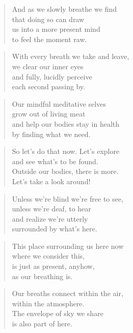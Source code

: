 \documentclass[10pt,a4paper]{article}
\begin{document}
\begin{paracol}{2}
\begin{verse}
And as we slowly breathe we find\\
that doing so can draw\\
us into a more present mind\\
to feel the moment raw.
\end{verse}

\begin{verse}
With every breath we take and leave,\\
we clear our inner eyes\\
and fully, lucidly perceive\\
each second passing by.
\end{verse}

\begin{verse}
Our mindful meditative selves\\
grow out of living meat\\
and help our bodies stay in health\\
by finding what we need.
\end{verse}

\begin{verse}
So let’s do that now. Let’s explore\\
and see what’s to be found.\\
Outside our bodies, there is more.\\
Let’s take a look around!
\end{verse}

\begin{verse}
Unless we’re blind we’re free to see,\\
unless we’re deaf, to hear\\
and realize we’re utterly\\
surrounded by what’s here.
\end{verse}

\begin{verse}
This place surrounding us here now\\
where we consider this,\\
is just as present, anyhow,\\
as our breathing is.
\end{verse}

\begin{verse}
Our breaths connect within the air,\\
within the atmosphere.\\
The envelope of sky we share\\
is also part of here.
\end{verse}


\end{paracol}
\end{document}
